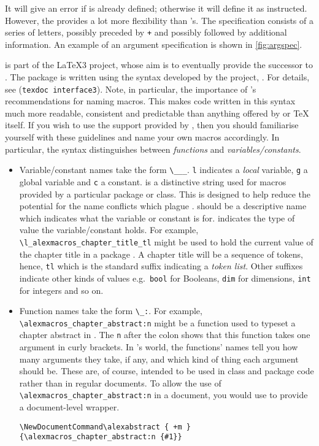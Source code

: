 It will give an error if  is already defined; otherwise it will define it as instructed.
However, the  provides a lot more flexibility than 's.
The specification consists of a series of letters, possibly preceded by \verb|+| and possibly followed by additional information.
An example of an argument specification is shown in \cref{fig:argspec}.

 is part of the \LaTeX 3 project, whose aim is to eventually provide the successor to \LaTeXe.
The package is written using the syntax developed by the project, .
For details, see  (\verb|texdoc interface3|).
Note, in particular, the importance of 's recommendations for naming macros.
This makes code written in this syntax much more readable, consistent and predictable than anything offered by \LaTeXe{} or \TeX{} itself.
If you wish to use the support provided by , then you should familiarise yourself with these guidelines and name your own macros accordingly.
In particular, the syntax distinguishes between \emph{functions} and \emph{variables/constants}.
\begin{itemize}
  \item Variable/constant names take the form \verb|\|\verb|_|\verb|_|\verb|_|.
  \verb|l| indicates a \emph{local} variable, \verb|g| a global variable and \verb|c| a constant.
   is a distinctive string used for macros provided by a particular package or class.
  This is designed to help reduce the potential for the name conflicts which plague \LaTeXe.
   should be a descriptive name which indicates what the variable or constant is for.
   indicates the type of value the variable/constant holds.
  For example, \verb|\l_alexmacros_chapter_title_tl| might be used to hold the current value of the chapter title in a package .
  A chapter title will be a sequence of tokens, hence, \verb|tl| which is the standard suffix indicating a \emph{token list}.
  Other suffixes indicate other kinds of values e.g.~\verb|bool| for Booleans, \verb|dim| for dimensions, \verb|int| for integers and so on.
  \item Function names take the form \verb|\|\verb|_|\verb|:|.
  For example, \verb|\alexmacros_chapter_abstract:n| might be a function used to typeset a chapter abstract in .
  The \verb|n| after the colon shows that this function takes one argument in curly brackets.
  In 's world, the functions' names tell you how many arguments they take, if any, and which kind of thing each argument should be. 
  These are, of course, intended to be used in class and package code rather than in regular documents.
  To allow the use of \verb|\alexmacros_chapter_abstract:n| in a document, you would use  to provide a document-level wrapper.
\begin{verbatim}
\NewDocumentCommand\alexabstract { +m }{\alexmacros_chapter_abstract:n {#1}}
\end{verbatim}
\end{itemize}
